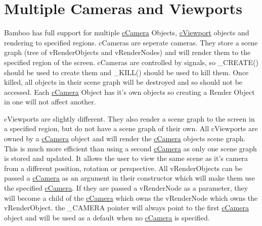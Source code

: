  \hypertarget{_using_engine_page_MultipleCamerasViewports}{}\section{Multiple Cameras and Viewports}\label{_using_engine_page_MultipleCamerasViewports}
Bamboo has full support for multiple \hyperlink{classc_camera}{cCamera} Objects, \hyperlink{classc_viewport}{cViewport} objects and rendering to specified regions. cCameras are seperate cameras. They store a scene graph (tree of vRenderObjects and vRenderNodes) and will render them to the specified region of the screen. cCameras are controlled by signals, so \_\-CREATE() should be used to create them and \_\-KILL() should be used to kill them. Once killed, all objects in their scene graph will be destroyed and so should not be accessed. Each \hyperlink{classc_camera}{cCamera} Object has it's own objects so creating a Render Object in one will not affect another. \par
 cViewports are slightly different. They also render a scene graph to the screen in a specified region, but do not have a scene graph of their own. All cViewports are owned by a \hyperlink{classc_camera}{cCamera} object and will render the \hyperlink{classc_camera}{cCamera} objects scene graph. This is much more efficient than using a second \hyperlink{classc_camera}{cCamera} as only one scene graph is stored and updated. It allows the user to view the same scene as it's camera from a different position, rotation or perspective. All vRenderObjects can be passed a \hyperlink{classc_camera}{cCamera} as an argument in their constructor which will make them use the specified \hyperlink{classc_camera}{cCamera}. If they are passed a vRenderNode as a parameter, they will become a child of the \hyperlink{classc_camera}{cCamera} which owns the vRenderNode which owns the vRenderObject. the \_\-CAMERA pointer will always point to the first \hyperlink{classc_camera}{cCamera} object and will be used as a default when no \hyperlink{classc_camera}{cCamera} is specified. 

